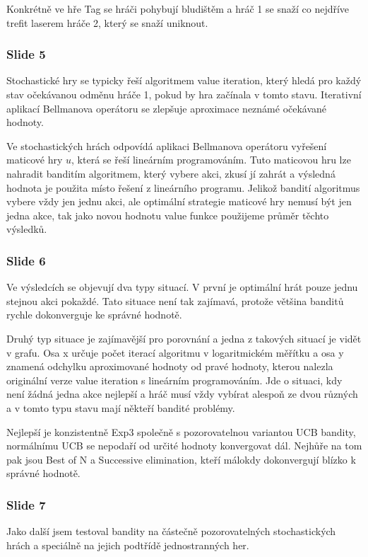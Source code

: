 \documentclass[11pt]{article}
\begin{document}
Konkrétně ve hře Tag se hráči pohybují bludištěm a hráč 1 se snaží co nejdříve trefit laserem hráče 2, který se snaží uniknout.

\subsubsection*{Slide 5}
Stochastické hry se typicky řeší algoritmem value iteration, který hledá pro každý stav očekávanou odměnu hráče 1, pokud by hra začínala v tomto stavu.
Iterativní aplikací Bellmanova operátoru se zlepšuje aproximace neznámé očekávané hodnoty.

Ve stochastických hrách odpovídá aplikaci Bellmanova operátoru vyřešení maticové hry $u$, která se řeší lineárním programováním.
Tuto maticovou hru lze nahradit banditím algoritmem, který vybere akci, zkusí jí zahrát a výsledná hodnota je použita místo řešení z lineárního programu.
Jelikož bandití algoritmus vybere vždy jen jednu akci, ale optimální strategie maticové hry nemusí být jen jedna akce, tak jako novou hodnotu value funkce použijeme průměr těchto výsledků.

\subsubsection*{Slide 6}
Ve výsledcích se objevují dva typy situací.
V první je optimální hrát pouze jednu stejnou akci pokaždé.
Tato situace není tak zajímavá, protože většina banditů rychle dokonverguje ke správné hodnotě.

Druhý typ situace je zajímavější pro porovnání a jedna z takových situací je vidět v grafu.
Osa x určuje počet iterací algoritmu v logaritmickém měřítku a osa y znamená odchylku aproximované hodnoty od pravé hodnoty, kterou nalezla originální verze value iteration s lineárním programováním.
Jde o situaci, kdy není žádná jedna akce nejlepší a hráč musí vždy vybírat alespoň ze dvou různých a v tomto typu stavu mají někteří bandité problémy.

Nejlepší je konzistentně Exp3 společně s pozorovatelnou variantou UCB bandity, normálnímu UCB se nepodaří od určité hodnoty konvergovat dál.
Nejhůře na tom pak jsou Best of N a Successive elimination, kteří málokdy dokonvergují blízko k správné hodnotě.

\subsubsection*{Slide 7}
Jako další jsem testoval bandity na částečně pozorovatelných stochastických hrách a speciálně na jejich podtřídě jednostranných her.
\end{document}
